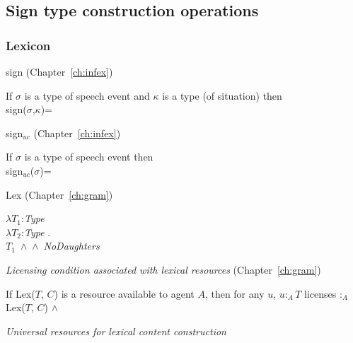 


\subsection{Sign type construction operations}
\label{app:signtypeconstr}

\subsubsection{Lexicon}
\label{app:lexuniversal}

sign (Chapter~\ref{ch:infex})

If $\sigma$ is a type of speech event and $\kappa$ is a type (of
situation) then \\
sign($\sigma$,$\kappa$)= 

sign$_{\mathit{uc}}$ (Chapter~\ref{ch:infex})

If $\sigma$ is a type of speech event then \\
sign$_{\mathit{uc}}$($\sigma$)= 

Lex (Chapter~\ref{ch:gram})

$\lambda T_1$:\textit{Type}\\
\hspace*{.25em}$\lambda T_2$:\textit{Type} . \\
\hspace*{.5em}\mbox{$T_1$ \d{$\wedge$}
      \d{$\wedge$} \textit{NoDaughters}}

\textit{Licensing condition associated with lexical resources}
(Chapter~\ref{ch:gram})

If Lex($T$, $C$) is a resource available to agent $A$, then for any
$u$, $u:_A T$ licenses $:_A$ Lex($T$, $C$)
\d{$\wedge$}

\textit{Universal resources for lexical content construction}

